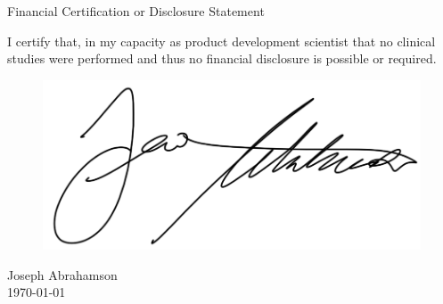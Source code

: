 \newpage
{}
\singlespacing
\begin{center}
  \large{Financial Certification or Disclosure Statement}
\end{center}

\onehalfspacing

I certify that, in my capacity as product development scientist that
no clinical studies were performed and thus no financial disclosure is
possible or required.

\begin{figure}[H]
  \includegraphics[width=0.35\linewidth]{imgs/ja-sig}
\end{figure}

\noindent Joseph Abrahamson \\
\today

